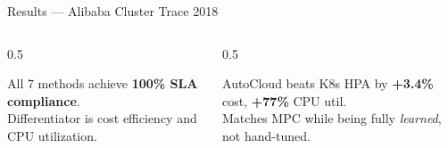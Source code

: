 \documentclass[aspectratio=169,10pt]{beamer}
\begin{document}
\begin{frame}{Results --- Alibaba Cluster Trace 2018}
\vspace{0.05cm}
\begin{columns}
\begin{column}{0.5\textwidth}
\begin{tcolorbox}[accentbox]
\tiny All 7 methods achieve \textbf{100\% SLA compliance}.\\
Differentiator is cost efficiency and CPU utilization.
\end{tcolorbox}
\end{column}
\begin{column}{0.5\textwidth}
\begin{tcolorbox}[warnbox]
\tiny AutoCloud beats K8s HPA by \textbf{+3.4\%} cost, \textbf{+77\%} CPU util.\\
Matches MPC while being fully \emph{learned}, not hand-tuned.
\end{tcolorbox}
\end{column}
\end{columns}
\end{frame}
\end{document}

